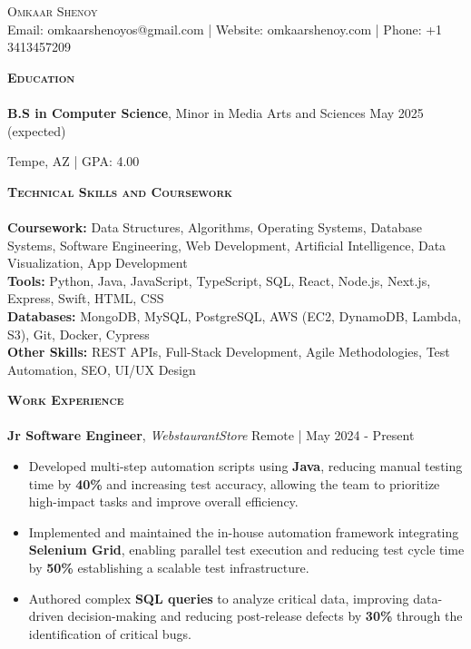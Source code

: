 \documentclass[10pt]{article}
\newcommand{\lineunder} {
    \vspace*{-8pt} \\
    \hspace*{-18pt} \hrulefill \\
}
\newcommand{\header} [1] {
    {\hspace*{-15pt}\vspace*{3pt} \textsc{#1}}
    \vspace*{-2pt} \lineunder
}
\begin{document}
\begin{center}
  {\Huge \scshape {Omkaar Shenoy}}\\
  \vspace{1mm}
  Email: omkaarshenoyos@gmail.com |  Website: omkaarshenoy.com | Phone: +1 3413457209
\end{center}

\header{\textbf{Education}}
\vspace{0.5mm}
\textbf{B.S in Computer Science}, Minor in Media Arts and Sciences   \hfill May 2025 (expected)

 \hfill Tempe, AZ | {GPA: 4.00}
\\
\vspace{2mm}

\header{\textbf{Technical Skills and Coursework}}
\vspace{0.5mm}
\textbf{Coursework:} Data Structures, Algorithms, Operating Systems, Database Systems, Software Engineering, Web Development, Artificial Intelligence, Data Visualization, App Development \\
\vspace{0.5mm}
\textbf{Tools:} Python, Java, JavaScript, TypeScript, SQL, React, Node.js, Next.js, Express, Swift, HTML, CSS \\
\vspace{0.5mm}
\textbf{Databases:} MongoDB, MySQL, PostgreSQL, AWS (EC2, DynamoDB, Lambda, S3), Git, Docker, Cypress \\
\vspace{0.5mm}
\textbf{Other Skills:} REST APIs, Full-Stack Development, Agile Methodologies, Test Automation, SEO, UI/UX Design \\
\vspace{2mm}
\header{\textbf{Work Experience}}
\vspace{0.5mm}
\textbf{Jr Software Engineer}, \textit{WebstaurantStore} \hfill Remote | May 2024 - Present\\
\vspace{-1mm}
\begin{itemize}[leftmargin=5mm, itemsep=0mm]
  
    \item Developed multi-step automation scripts using \textbf{Java}, reducing manual testing time by \textbf{40\%} and increasing test accuracy, allowing the team to prioritize high-impact tasks and improve overall efficiency.
    \item Implemented and maintained the in-house automation framework integrating \textbf{Selenium Grid}, enabling parallel test execution and reducing test cycle time by \textbf{50\%} establishing a scalable test infrastructure.
    \item Authored complex \textbf{SQL queries} to analyze critical data, improving data-driven decision-making and reducing post-release defects by \textbf{30\%} through the identification of critical bugs.
\end{itemize}
\end{document}
